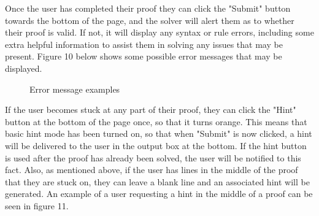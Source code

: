 Once the user has completed their proof they can click the "Submit" button towards the bottom of the page, and the solver will alert them as to whether their proof is valid. If not, it will display any syntax or rule errors, including some extra helpful information to assist them in solving any issues that may be present. Figure 10 below shows some possible error messages that may be displayed.
\pagebreak

\begin{figure}[!ht]
	\centering
	\caption{Error message examples}
\end{figure}

If the user becomes stuck at any part of their proof, they can click the "Hint" button at the bottom of the page once, so that it turns orange. This means that basic hint mode has been turned on, so that when "Submit" is now clicked, a hint will be delivered to the user in the output box at the bottom. If the hint button is used after the proof has already been solved, the user will be notified to this fact. Also, as mentioned above, if the user has lines in the middle of the proof that they are stuck on, they can leave a blank line and an associated hint will be generated. An example of a user requesting a hint in the middle of a proof can be seen in figure 11.

